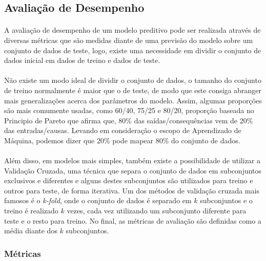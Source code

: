 \documentclass[grad,numbers]{coppe}
\begin{document}
		\subsection{Avaliação de Desempenho}
			\paragraph{}A avaliação de desempenho de um modelo preditivo pode ser realizada através de diversas métricas que são medidas diante de uma previsão do modelo sobre um conjunto de dados de teste, logo, existe uma necessidade em dividir o conjunto de dados inicial em dados de treino e dados de teste.
			\paragraph{}Não existe um modo ideal de dividir o conjunto de dados, o tamanho do conjunto de treino normalmente é maior que o de teste, de modo que este consiga abranger mais generalizações acerca dos parâmetros do modelo. Assim, algumas proporções são mais comumente usadas, como 60/40, 75/25 e 80/20, proporção baseada no Principio de Pareto que afirma que, 80\% das saídas/consequências vem de 20\% das entradas/causas\cite{pareto_principle}. Levando em consideração o escopo de Aprendizado de Máquina, podemos dizer que 20\% pode mapear 80\% do conjunto de dados.
			\paragraph{}Além disso, em modelos mais simples, também existe a possibilidade de utilizar a Validação Cruzada, uma técnica que separa o conjunto de dados em subconjuntos exclusivos e diferentes e alguns destes subconjuntos são utilizados para treino e outros para teste, de forma iterativa. Um dos métodos de validação cruzada mais famosos é o \textit{k-fold}, onde o conjunto de dados é separado em $k$ subconjuntos e o treino é realizado $k$ vezes, cada vez utilizando um subconjunto diferente para teste e o resto para treino\cite{k-fold}. No final, as métricas de avaliação são definidas como a média diante dos $k$ subconjuntos.
			\subsubsection{Métricas}\label{sec:metricas}
\end{document}
